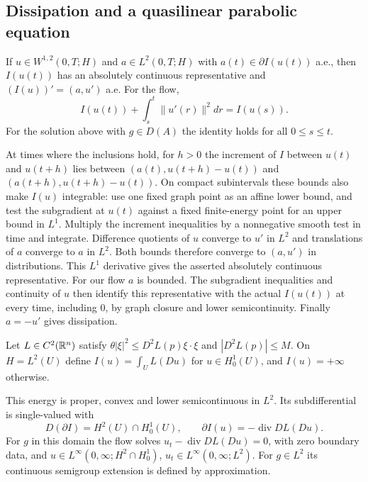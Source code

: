 \subsection{Dissipation and a quasilinear parabolic equation}
\Needspace{50mm}
\begin{lemma}
If $u\in W^{1,2}(0,T;H)$ and $a\in L^2(0,T;H)$ with
$a(t)\in\partial I(u(t))$ a.e., then $I(u(t))$ has an absolutely
continuous representative and $(I(u))'=(a,u')$ a.e. For the flow,
\[
 I(u(t))+\int_s^t\|u'(r)\|^2dr=I(u(s)).
\]
For the solution above with $g\in D(A)$ the identity holds for all
$0\leq s\leq t$.
\end{lemma}
\begin{expandedproof}
At times where the inclusions hold, for $h>0$ the increment of $I$
between $u(t)$ and $u(t+h)$ lies between
$(a(t),u(t+h)-u(t))$ and $(a(t+h),u(t+h)-u(t))$.
On compact subintervals these bounds also make $I(u)$ integrable:
use one fixed graph point as an affine lower bound, and test the
subgradient at $u(t)$ against a fixed finite-energy point for an upper
bound in $L^1$. Multiply the increment inequalities by a nonnegative
smooth test in time and integrate. Difference quotients of $u$ converge
to $u'$ in $L^2$ and translations of $a$ converge to $a$ in $L^2$.
Both bounds therefore converge to $(a,u')$ in distributions. This
$L^1$ derivative gives the asserted absolutely continuous representative.
For our flow $a$ is bounded. The subgradient inequalities and continuity
of $u$ then identify this representative with the actual $I(u(t))$
at every time, including $0$, by graph closure and lower semicontinuity.
Finally $a=-u'$ gives dissipation.
\end{expandedproof}
Let $L\in C^2(\mathbb{R}^n)$ satisfy
$\theta|\xi|^2\leq D^2L(p)\xi\cdot\xi$ and $|D^2L(p)|\leq M$.
On $H=L^2(U)$ define $I(u)=\int_U L(Du)$ for $u\in H^1_0(U)$,
and $I(u)=+\infty$ otherwise.
\Needspace{50mm}
\begin{theorem}
This energy is proper, convex and lower semicontinuous in $L^2$.
Its subdifferential is single-valued with
\[
 D(\partial I)=H^2(U)\cap H^1_0(U),\qquad
 \partial I(u)=-\operatorname{div}DL(Du).
\]
For $g$ in this domain the flow solves
$u_t-\operatorname{div}DL(Du)=0$, with zero boundary data, and
$u\in L^\infty(0,\infty;H^2\cap H^1_0)$,
$u_t\in L^\infty(0,\infty;L^2)$. For $g\in L^2$ its continuous
semigroup extension is defined by approximation.
\end{theorem}
